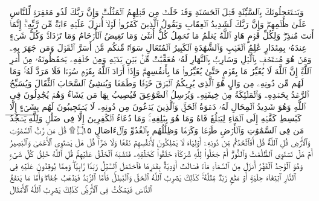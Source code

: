 \startbuffer[\q:13:6]
وَیَسۡتَعۡجِلُونَكَ بِٱلسَّیِّئَةِ قَبۡلَ ٱلۡحَسَنَةِ وَقَدۡ خَلَتۡ مِن قَبۡلِهِمُ ٱلۡمَثُلَٰتُۗ وَإِنَّ رَبَّكَ لَذُو مَغۡفِرَةࣲ لِّلنَّاسِ عَلَىٰ ظُلۡمِهِمۡۖ وَإِنَّ رَبَّكَ لَشَدِیدُ ٱلۡعِقَابِ%
\stopbuffer%
\startbuffer[\q:13:7]
وَیَقُولُ ٱلَّذِینَ كَفَرُوا۟ لَوۡلَاۤ أُنزِلَ عَلَیۡهِ ءَایَةࣱ مِّن رَّبِّهِۦۤۗ إِنَّمَاۤ أَنتَ مُنذِرࣱۖ وَلِكُلِّ قَوۡمٍ هَادٍ%
\stopbuffer%
\startbuffer[\q:13:8]
ٱللَّهُ یَعۡلَمُ مَا تَحۡمِلُ كُلُّ أُنثَىٰ وَمَا تَغِیضُ ٱلۡأَرۡحَامُ وَمَا تَزۡدَادُۚ وَكُلُّ شَیۡءٍ عِندَهُۥ بِمِقۡدَارٍ%
\stopbuffer%
\startbuffer[\q:13:9]
عَٰلِمُ ٱلۡغَیۡبِ وَٱلشَّهَٰدَةِ ٱلۡكَبِیرُ ٱلۡمُتَعَالِ%
\stopbuffer%
\startbuffer[\q:13:10]
سَوَاۤءࣱ مِّنكُم مَّنۡ أَسَرَّ ٱلۡقَوۡلَ وَمَن جَهَرَ بِهِۦ وَمَنۡ هُوَ مُسۡتَخۡفِۭ بِٱلَّیۡلِ وَسَارِبُۢ بِٱلنَّهَارِ%
\stopbuffer%
\startbuffer[\q:13:11]
لَهُۥ مُعَقِّبَٰتࣱ مِّنۢ بَیۡنِ یَدَیۡهِ وَمِنۡ خَلۡفِهِۦ یَحۡفَظُونَهُۥ مِنۡ أَمۡرِ ٱللَّهِۗ إِنَّ ٱللَّهَ لَا یُغَیِّرُ مَا بِقَوۡمٍ حَتَّىٰ یُغَیِّرُوا۟ مَا بِأَنفُسِهِمۡۗ وَإِذَاۤ أَرَادَ ٱللَّهُ بِقَوۡمࣲ سُوۤءࣰا فَلَا مَرَدَّ لَهُۥۚ وَمَا لَهُم مِّن دُونِهِۦ مِن وَالٍ%
\stopbuffer%
\startbuffer[\q:13:12]
هُوَ ٱلَّذِی یُرِیكُمُ ٱلۡبَرۡقَ خَوۡفࣰا وَطَمَعࣰا وَیُنشِئُ ٱلسَّحَابَ ٱلثِّقَالَ%
\stopbuffer%
\startbuffer[\q:13:13]
وَیُسَبِّحُ ٱلرَّعۡدُ بِحَمۡدِهِۦ وَٱلۡمَلَٰۤئِكَةُ مِنۡ خِیفَتِهِۦ وَیُرۡسِلُ ٱلصَّوَٰعِقَ فَیُصِیبُ بِهَا مَن یَشَاۤءُ وَهُمۡ یُجَٰدِلُونَ فِی ٱللَّهِ وَهُوَ شَدِیدُ ٱلۡمِحَالِ%
\stopbuffer%
\startbuffer[\q:13:14]
لَهُۥ دَعۡوَةُ ٱلۡحَقِّۚ وَٱلَّذِینَ یَدۡعُونَ مِن دُونِهِۦ لَا یَسۡتَجِیبُونَ لَهُم بِشَیۡءٍ إِلَّا كَبَٰسِطِ كَفَّیۡهِ إِلَى ٱلۡمَاۤءِ لِیَبۡلُغَ فَاهُ وَمَا هُوَ بِبَٰلِغِهِۦۚ وَمَا دُعَاۤءُ ٱلۡكَٰفِرِینَ إِلَّا فِی ضَلَٰلࣲ%
\stopbuffer%
\startbuffer[\q:13:15]
وَ̅لِ̅لَّ̅هِ̅ ̅یَ̅سۡ̅جُ̅دُ̅ مَن فِی ٱلسَّمَٰوَٰتِ وَٱلۡأَرۡضِ طَوۡعࣰا وَكَرۡهࣰا وَظِلَٰلُهُم بِٱلۡغُدُوِّ وَٱلۡءَاصَالِ ۝١٥ ۩%
\stopbuffer%
\startbuffer[\q:13:16]
قُلۡ مَن رَّبُّ ٱلسَّمَٰوَٰتِ وَٱلۡأَرۡضِ قُلِ ٱللَّهُۚ قُلۡ أَفَٱتَّخَذۡتُم مِّن دُونِهِۦۤ أَوۡلِیَاۤءَ لَا یَمۡلِكُونَ لِأَنفُسِهِمۡ نَفۡعࣰا وَلَا ضَرࣰّاۚ قُلۡ هَلۡ یَسۡتَوِی ٱلۡأَعۡمَىٰ وَٱلۡبَصِیرُ أَمۡ هَلۡ تَسۡتَوِی ٱلظُّلُمَٰتُ وَٱلنُّورُۗ أَمۡ جَعَلُوا۟ لِلَّهِ شُرَكَاۤءَ خَلَقُوا۟ كَخَلۡقِهِۦ فَتَشَٰبَهَ ٱلۡخَلۡقُ عَلَیۡهِمۡۚ قُلِ ٱللَّهُ خَٰلِقُ كُلِّ شَیۡءࣲ وَهُوَ ٱلۡوَٰحِدُ ٱلۡقَهَّٰرُ%
\stopbuffer%
\startbuffer[\q:13:17]
أَنزَلَ مِنَ ٱلسَّمَاۤءِ مَاۤءࣰ فَسَالَتۡ أَوۡدِیَةُۢ بِقَدَرِهَا فَٱحۡتَمَلَ ٱلسَّیۡلُ زَبَدࣰا رَّابِیࣰاۖ وَمِمَّا یُوقِدُونَ عَلَیۡهِ فِی ٱلنَّارِ ٱبۡتِغَاۤءَ حِلۡیَةٍ أَوۡ مَتَٰعࣲ زَبَدࣱ مِّثۡلُهُۥۚ كَذَٰلِكَ یَضۡرِبُ ٱللَّهُ ٱلۡحَقَّ وَٱلۡبَٰطِلَۚ فَأَمَّا ٱلزَّبَدُ فَیَذۡهَبُ جُفَاۤءࣰۖ وَأَمَّا مَا یَنفَعُ ٱلنَّاسَ فَیَمۡكُثُ فِی ٱلۡأَرۡضِۚ كَذَٰلِكَ یَضۡرِبُ ٱللَّهُ ٱلۡأَمۡثَالَ%
